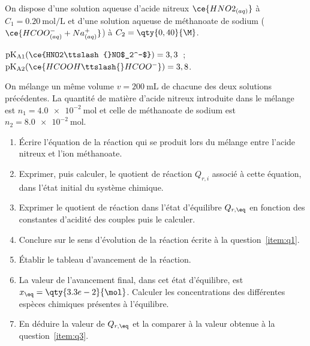 On dispose d'une solution aqueuse d'acide nitreux $\ce{HNO2_{(aq)}}$ à
$C_1=\qty{0.20}{\mol\per\L}$ et d'une solution aqueuse de méthanoate de sodium
($\ce{HCOO^{-}_{(aq)} + Na^{+}_{(aq)}}$) à $C_{2}=\qty{0,40}{\M}$.

\begin{donnees}
    $\mathrm{pK_{A1}}(\ce{HNO2\ttslash{}NO$_2^-$})=3,3$~; \
    $\mathrm{pK_{A2}}(\ce{HCOOH\ttslash{}HCOO^-})=3,8$.
\end{donnees}

On mélange un même volume $v=\qty{200}{\mL}$ de chacune des deux solutions
précédentes. La quantité de matière d'acide nitreux introduite dans le mélange
est $n_{1}=\qty{4.0e-2}{\mol}$ et celle de méthanoate de sodium
est $n_{2}=\qty{8.0e-2}{\mol}$.

\begin{enumerate}
    \item \label{item:q1}
          Écrire l'équation de la réaction qui se produit lors du mélange entre
          l'acide nitreux et l'ion méthanoate.
    \item Exprimer, puis calculer, le quotient de réaction $Q_{r,i}$ associé à
          cette équation, dans l'état initial du système chimique.
    \item \label{item:q3}
          Exprimer le quotient de réaction dans l'état d'équilibre $Q_{r,\eq}$
          en fonction des constantes d'acidité des couples puis le calculer.
    \item Conclure sur le sens d'évolution de la réaction écrite à la
          question~\ref{item:q1}.
    \item Établir le tableau d'avancement de la réaction.
    \item La valeur de l'avancement final, dans cet état d'équilibre, est
          $x_{\eq}=\qty{3.3e-2}{\mol}$. Calculer les concentrations des
          différentes espèces chimiques présentes à l'équilibre.
    \item En déduire la valeur de $Q_{r,\eq}$ et la comparer à la valeur obtenue
          à la question~\ref{item:q3}.
\end{enumerate}

